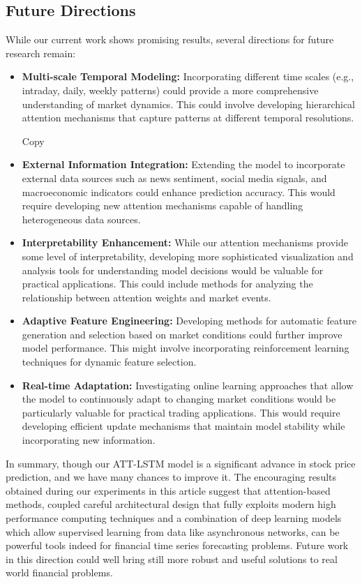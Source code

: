 \documentclass[10pt,twocolumn,letterpaper]{article}
\begin{document}
\subsection{Future Directions}
While our current work shows promising results, several directions for future research remain:
\begin{itemize}
	\item \textbf{Multi-scale Temporal Modeling:} Incorporating different time scales (e.g., intraday, daily, weekly patterns) could provide a more comprehensive understanding of market dynamics. This could involve developing hierarchical attention mechanisms that capture patterns at different temporal resolutions.
	
	Copy\item \textbf{External Information Integration:} Extending the model to incorporate external data sources such as news sentiment, social media signals, and macroeconomic indicators could enhance prediction accuracy. This would require developing new attention mechanisms capable of handling heterogeneous data sources.
	
	\item \textbf{Interpretability Enhancement:} While our attention mechanisms provide some level of interpretability, developing more sophisticated visualization and analysis tools for understanding model decisions would be valuable for practical applications. This could include methods for analyzing the relationship between attention weights and market events.
	
	\item \textbf{Adaptive Feature Engineering:} Developing methods for automatic feature generation and selection based on market conditions could further improve model performance. This might involve incorporating reinforcement learning techniques for dynamic feature selection.
	
	\item \textbf{Real-time Adaptation:} Investigating online learning approaches that allow the model to continuously adapt to changing market conditions would be particularly valuable for practical trading applications. This would require developing efficient update mechanisms that maintain model stability while incorporating new information.
\end{itemize}
In summary, though our ATT-LSTM model is a significant advance in stock price prediction, and we have many chances to improve it. The encouraging results obtained during our experiments in this article suggest that attention-based methods, coupled careful architectural design that fully exploits modern high performance computing techniques and a combination of deep learning models which allow supervised learning from data like asynchronous networks, can be powerful tools indeed for financial time series forecasting problems. Future work in this direction could well bring still more robust and useful solutions to real world financial problems.



{\small


}
\end{document}
